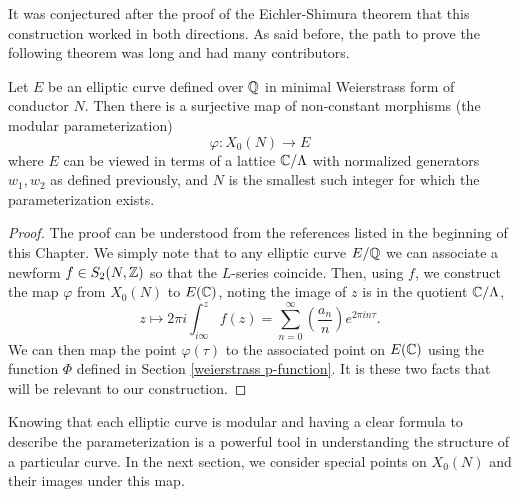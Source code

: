 It was conjectured after the proof of the Eichler-Shimura theorem that this construction worked in both directions. As said before, the path to prove the following theorem was long and had many contributors.  
\begin{thm} \label{modularity theorem}
Let $E$ be an elliptic curve defined over $\mathbb{Q}$ in minimal Weierstrass form of conductor $N$. Then there is a surjective map of non-constant morphisms (the modular parameterization)
$$\varphi:X_0(N) \to E$$
where $E$ can be viewed in terms of a lattice $\mathbb{C}/\Lambda$ with normalized generators $w_1, w_2$ as defined previously, and $N$ is the smallest such integer for which the parameterization exists.
\end{thm}
\begin{proof} The proof can be understood from the references listed in the beginning of this Chapter. We simply note that to any elliptic curve $E/\mathbb{Q}$ we can associate a newform $f \in S_2(N,\mathbb{Z})$ so that the $L$-series coincide. Then, using $f$, we construct the map $\varphi$ from $X_0(N)$ to $E(\mathbb{C})$, noting the image of $z$ is in the quotient $\mathbb{C}/\Lambda$, 
$$z \longmapsto 2\pi i \int_{i\infty}^{z}f(z) = \sum_{n=0}^\infty \left(\frac{a_n}{n}\right)e^{2\pi i n \tau}.$$
We can then map the point $\varphi(\tau)$ to the associated point on $E(\mathbb{C})$ using the function $\Phi$ defined in Section \ref{weierstrass p-function}. It is these two facts that will be relevant to our construction.
\end{proof}

Knowing that each elliptic curve is modular and having a clear formula to describe the parameterization is a powerful tool in understanding the structure of a particular curve. In the next section, we consider special points on $X_0(N)$ and their images under this map.